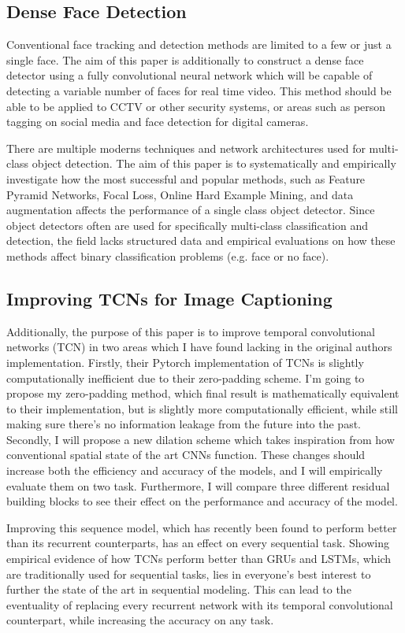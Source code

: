 \documentclass[a4paper, twoside]{article}
\begin{document}
\subsection{Dense Face Detection}
Conventional face tracking and detection methods are limited to a few or just a single face. The aim of this paper is additionally to construct a dense face detector using a fully convolutional neural network which will be capable of detecting a variable number of faces for real time video. This method should be able to be applied to CCTV or other security systems, or areas such as person tagging on social media and face detection for digital cameras.

There are multiple moderns techniques and network architectures used for multi-class object detection. The aim of this paper is to systematically and empirically investigate how the most successful and popular methods, such as Feature Pyramid Networks, Focal Loss, Online Hard Example Mining, and data augmentation affects the performance of a single class object detector. Since object detectors often are used for specifically multi-class classification and detection, the field lacks structured data and empirical evaluations on how these methods affect binary classification problems (e.g. face or no face).

\subsection{Improving TCNs for Image Captioning}
Additionally, the purpose of this paper is to improve temporal convolutional networks (TCN) in two areas which I have found lacking in the original authors implementation. Firstly, their Pytorch implementation of TCNs is slightly computationally inefficient due to their zero-padding scheme. I'm going to propose my zero-padding method, which final result is mathematically equivalent to their implementation, but is slightly more computationally efficient, while still making sure there's no information leakage from the future into the past. Secondly, I will propose a new dilation scheme which takes inspiration from how conventional spatial state of the art CNNs function. These changes should increase both the efficiency and accuracy of the models, and I will empirically evaluate them on two task. Furthermore, I will compare three different residual building blocks to see their effect on the performance and accuracy of the model.

Improving this sequence model, which has recently been found to perform better than its recurrent counterparts, has an effect on every sequential task. Showing empirical evidence of how TCNs perform better than GRUs and LSTMs, which are traditionally used for sequential tasks, lies in everyone's best interest to further the state of the art in sequential modeling. This can lead to the eventuality of replacing every recurrent network with its temporal convolutional counterpart, while increasing the accuracy on any task.
\end{document}
